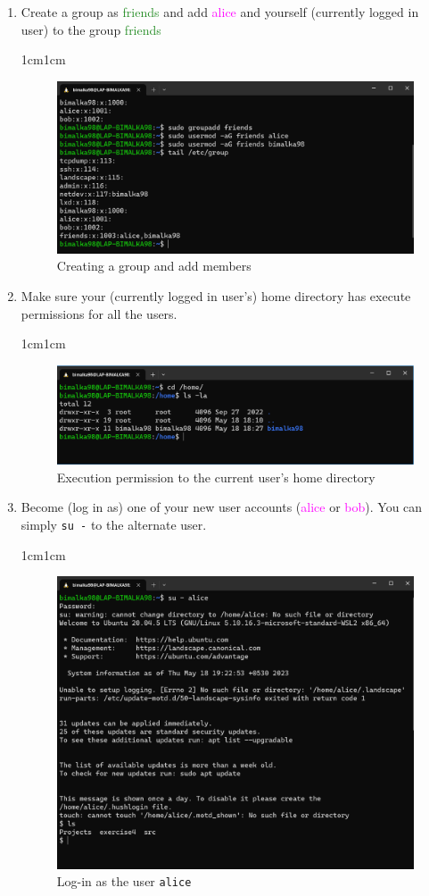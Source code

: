 \documentclass[11pt,letterpaper]{article}
\newenvironment{answer}{\em \color{blue} \begin{adjustwidth}{1cm}{1cm}}{\end{adjustwidth}}
\begin{document}
\begin{enumerate}
		\item Create a group as \textcolor{ForestGreen}{friends} and add \textcolor{magenta}{alice} and yourself (currently logged in user) to the group \textcolor{ForestGreen}{friends}
		
		\begin{answer}
			\begin{figure}[H]
				\centering
				\includegraphics[width=0.65\columnwidth]{images/q4}
				\caption{Creating a group and add members} \label{fig:q4}
			\end{figure}
		\end{answer}
		
		\item Make sure your (currently logged in user's) home directory has execute permissions for all the users.
		
		\begin{answer}
			\begin{figure}[H]
				\centering
				\includegraphics[width=0.65\columnwidth]{images/q5}
				\caption{Execution permission to the current user's home directory} \label{fig:q5}
			\end{figure}
		\end{answer}
		\pagebreak
		\item Become (log in as) one of your new user accounts (\textcolor{magenta}{alice} or \textcolor{magenta}{bob}). You can simply \texttt{su -} to the alternate user.
		
		\begin{answer}
			\begin{figure}[H]
				\centering
				\includegraphics[width=0.65\columnwidth]{images/q6}
				\caption{Log-in as the user {\tt alice}} \label{fig:q6}
			\end{figure}
		\end{answer}
		

\end{enumerate}
\end{document}
